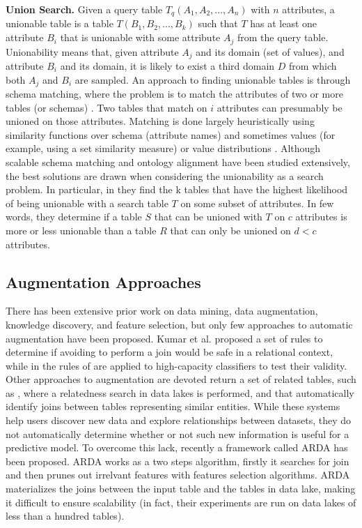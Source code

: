 \textbf{Union Search.} Given a query table $T_q(A_1,A_2,...,A_n)$ with $n$ attributes, a unionable table is a table $T(B_1, B_2,...,B_k)$ such that $T$ has at least one attribute $B_i$ that is unionable with some attribute $A_j$ from the query table. Unionability means that, given attribute $A_j$ and its domain (set of values), and attribute $B_i$ and its domain, it is likely to exist a third domain $D$ from which both $A_j$ and $B_i$ are sampled. An approach to finding unionable tables is through schema matching, where the problem is to match the attributes of two or more tables (or schemas) \cite{he2003statistical,rahm2011towards}. Two tables that match on $i$ attributes can presumably be unioned on those attributes. Matching is done largely heuristically using similarity functions over schema (attribute names) and sometimes values (for example, using a set similarity measure) or value distributions \cite{kang2003schema}. Although scalable schema matching and ontology alignment have been studied extensively, the best solutions are drawn when considering the unionability as a search problem. In particular, in \cite{nargesian2018table} they find the k tables that have the highest likelihood of being unionable with a search table $T$ on some subset of attributes. In few words, they determine if a table $S$ that can be unioned with $T$ on $c$ attributes is more or less unionable than a table $R$ that can only be unioned on $d < c$ attributes.


\subsection{Augmentation Approaches}
There has been extensive prior work on data mining, data augmentation, knowledge discovery, and feature selection, but only few approaches to automatic augmentation have been proposed. Kumar et al. \cite{kumar2016join} proposed a set of rules to determine if avoiding to perform a join would be safe in a relational context, while in \cite{shah2017key} the rules of \cite{kumar2016join} are applied to high-capacity classifiers to test their validity. Other approaches to augmentation are devoted return a set of related tables, such as \cite{bogatu2020dataset}, where a relatedness search in data lakes is performed, and \cite{fernandez2018aurum} that automatically identify joins between tables representing similar entities. While these systems help users discover new data and explore relationships between datasets, they do not automatically determine whether or not such new information
is useful for a predictive model. To overcome this lack, recently a framework called ARDA \cite{chepurko2020arda} has been proposed. ARDA works as a two steps algorithm, firstly it searches for join and then prunes out irrelvant features with features selection algorithms. ARDA materializes the joins between the input table and the tables in data lake, making it difficult to ensure scalability (in fact, their experiments are run on data lakes of less than a hundred tables).


